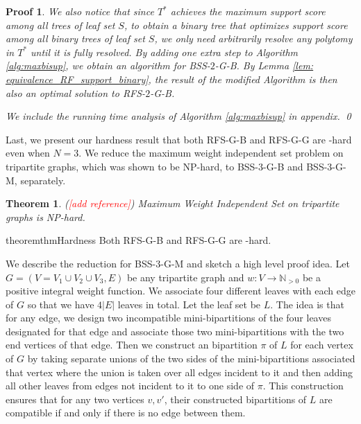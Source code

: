 \documentclass[twocolumn]{bmcart}%
\newcommand{\note}[1]{(\textcolor{red}{#1})}
\newcommand{\rfs}{\textsc{RFS}\xspace}
\newcommand{\bsstwo}{\textsc{BSS-$2$}\xspace}
\newcommand{\bssthree}{\textsc{BSS-$3$}\xspace}
\newcommand{\rftwo}{\textsc{RFS-$2$}\xspace}
\newcommand{\B}{\textsc{B}\xspace}
\renewcommand{\G}{\textsc{G}\xspace}
\renewcommand{\M}{\textsc{M}\xspace}
\theoremstyle{mystyle}
\newtheorem{theorem}{Theorem}
\theoremstyle{proofstyle}
\newtheorem*{proof2}{Proof}
\newenvironment{proofnospace}{\begin{proof2}}{\qed \end{proof2}}
\begin{document}
\begin{proofnospace}
We also notice that since $T^*$ achieves the maximum support score among all trees of leaf set $S$, to obtain a binary tree that optimizes support score among all binary trees of leaf set $S$, we only need arbitrarily resolve any polytomy in $T^*$ until it is fully resolved. By adding one extra step to Algorithm \ref{alg:maxbisup}, we obtain an algorithm for \bsstwo-\G-\B. By Lemma \ref{lem: equivalence_RF_support_binary}, the result of the modified Algorithm is then also an optimal solution to \rftwo-\G-\B.

We include the running time analysis of Algorithm \ref{alg:maxbisup} in appendix.
\end{proofnospace}


Last, we present our hardness result that both \rfs-\G-\B and \rfs-\G-\G are \NP-hard even when $N = 3$.  We reduce the maximum weight independent set problem on tripartite graphs, which was shown to be NP-hard, to \bssthree-\G-\B and \bssthree-\G-\M, separately. 

\begin{theorem}\label{thm:IS_tripartite_hardness} \note{[add reference]}
Maximum Weight Independent Set on tripartite graphs is NP-hard. 
\end{theorem}

\begin{restatable}{theorem}{thmHardness}\label{thm:hardness}
Both \rfs-\G-\B and \rfs-\G-\G are \NP-hard.
\end{restatable}
We describe the reduction for \bssthree-\G-\M and sketch a high level proof idea. Let $G = (V=V_1 \cup V_2 \cup V_3, E)$ be any tripartite graph and $w:V \to \mathbb{N}_{>0}$ be a positive integral weight function. We associate four different leaves with each edge of $G$ so that we have $4|E|$ leaves in total. Let the leaf set be $L$. The idea is that for any edge, we design two incompatible mini-bipartitions of the four leaves designated for that edge and associate those two mini-bipartitions with the two end vertices of that edge. Then we construct an bipartition $\pi$ of $L$ for each vertex of $G$ by taking separate unions of the two sides of the mini-bipartitions associated that vertex where the union is taken over all edges incident to it and then adding all other leaves from edges not incident to it to one side of $\pi$. This construction ensures that for any two vertices $v,v'$, their constructed bipartitions of $L$ are compatible if and only if there is no edge between them. 
\end{document}
